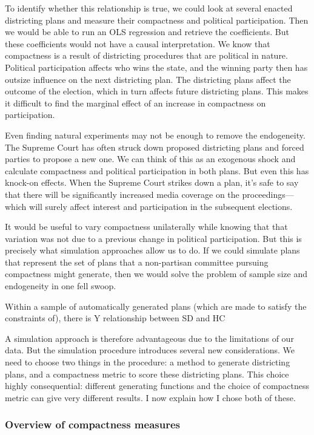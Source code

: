 \documentclass[]{article}
\begin{document}
To identify whether this relationship is true, we could look at several
enacted districting plans and measure their compactness and political
participation. Then we would be able to run an OLS regression and
retrieve the coefficients. But these coefficients would not have a
causal interpretation. We know that compactness is a result of
districting procedures that are political in nature. Political
participation affects who wins the state, and the winning party then has
outsize influence on the next districting plan. The districting plans
affect the outcome of the election, which in turn affects future
districting plans. This makes it difficult to find the marginal effect
of an increase in compactness on participation.

Even finding natural experiments may not be enough to remove the
endogeneity. The Supreme Court has often struck down proposed
districting plans and forced parties to propose a new one. We can think
of this as an exogenous shock and calculate compactness and political
participation in both plans. But even this has knock-on effects. When
the Supreme Court strikes down a plan, it's safe to say that there will
be significantly increased media coverage on the proceedings---which
will surely affect interest and participation in the subsequent
elections.

It would be useful to vary compactness unilaterally while knowing that
that variation was not due to a previous change in political
participation. But this is precisely what simulation approaches allow us
to do. If we could simulate plans that represent the set of plans that a
non-partisan committee pursuing compactness might generate, then we
would solve the problem of sample size and endogeneity in one fell
swoop.

Within a sample of automatically generated plans (which are made to
satisfy the constraints of), there is Y relationship between SD and HC

A simulation approach is therefore advantageous due to the limitations
of our data. But the simulation procedure introduces several new
considerations. We need to choose two things in the procedure: a method
to generate districting plans, and a compactness metric to score these
districting plans. This choice highly consequential: different
generating functions and the choice of compactness metric can give very
different results. I now explain how I chose both of these.

\hypertarget{overview-of-compactness-measures}{%
\subsubsection{Overview of compactness
measures}\label{overview-of-compactness-measures}}
\end{document}
